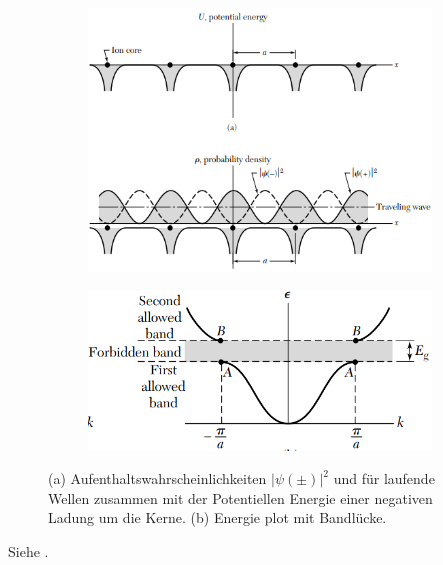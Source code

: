 \begin{figure}[H]
    \centering
    \begin{subfigure}[c]{0.4\textwidth}
        \includegraphics[width=\linewidth]{resources/15-06-2015/q37a.png}
        \caption{}
    \end{subfigure}%
    \begin{subfigure}[c]{0.4\textwidth}
        \includegraphics[width=\textwidth]{resources/15-06-2015/q37b.png}
        \caption{}
    \end{subfigure}%
    \caption{
        (a) Aufenthaltswahrscheinlichkeiten $\left|\psi(\pm)\right|^2$ und für laufende Wellen zusammen mit der Potentiellen Energie einer negativen Ladung um die Kerne.
        (b) Energie plot mit Bandlücke.
        }
\end{figure}

\label{q:38}

Siehe .

